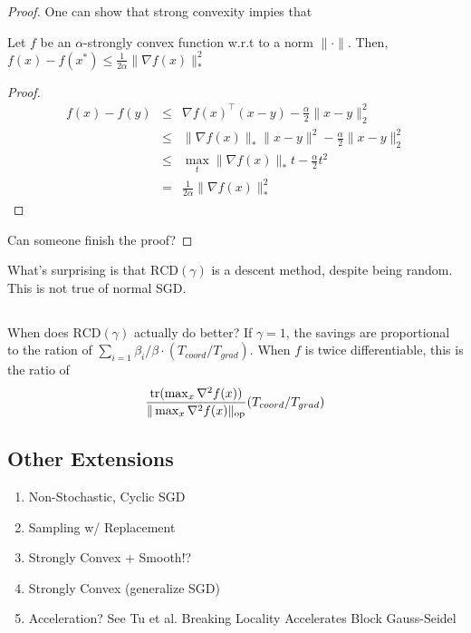	\begin{proof} One can show that strong convexity impies that 
	\begin{lemma} Let $f$ be an $\alpha$-strongly convex function w.r.t to a norm $\|\cdot\|$. Then, $f(x) - f(x^*) \le \frac{1}{2\alpha} \|\nabla f(x)\|_*^2$
	 \end{lemma}
	 \begin{proof}
	 \begin{eqnarray*}
	 f(x) - f(y) &\le& \nabla f(x)^\top (x -y ) - \frac{\alpha}{2}\|x - y\|^2_2\\
	 &\le& \|\nabla f(x)\|_* \|x - y\|^2 - \frac{\alpha}{2}\|x - y\|^2_2\\
	 &\le& \max_t \|\nabla f(x)\|_* t - \frac{\alpha}{2}t^2\\
	 	&=&  \frac{1}{2\alpha} \|\nabla f(x)\|_*^2
	 \end{eqnarray*}
	 \end{proof}
	 Can someone finish the proof?
	\end{proof}

	 


	 What's surprising is that $\mathrm{RCD}(\gamma)$ is a descent method, despite being random. This is not true of normal SGD. 


	\subsection{}
	When does $\mathrm{RCD}(\gamma)$ actually do better? If $\gamma = 1$, the savings are proportional to the ration of $\sum_{i=1} \beta_i / \beta \cdot (T_{coord}/T_{grad})$. When $f$ is twice differentiable, this is the ratio of 
	\begin{eqnarray}
	\frac{\mathrm{tr}(\max_{x} \nabla^2 f(x))}{\|\max_{x} \nabla^2 f(x)\|_{\mathrm{op}}} (T_{coord}/T_{grad})
	\end{eqnarray}
	\subsection{Other Extensions}
	\begin{enumerate}
		\item Non-Stochastic, Cyclic SGD
		\item Sampling w/ Replacement
		\item Strongly Convex + Smooth!?
		\item Strongly Convex (generalize SGD)
		\item Acceleration? See Tu et al. Breaking Locality Accelerates Block Gauss-Seidel
	\end{enumerate}
	
